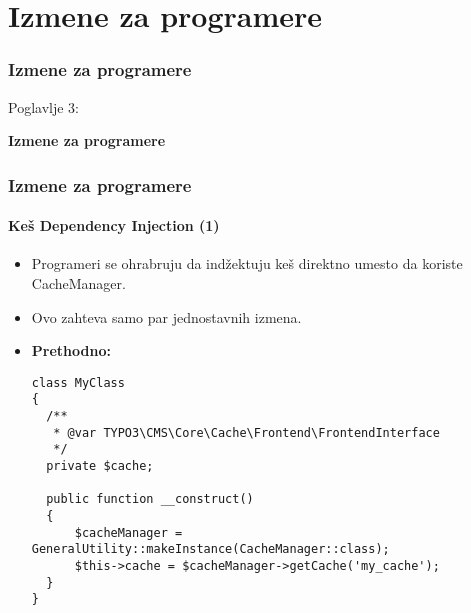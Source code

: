 %

\section{Izmene za programere}
\begin{frame}[fragile]
	\frametitle{Izmene za programere}

	\begin{center}\huge{Poglavlje 3:}\end{center}
	\begin{center}\huge{\color{typo3darkgrey}\textbf{Izmene za programere}}\end{center}

\end{frame}


\begin{frame}[fragile]
	\frametitle{Izmene za programere}
	\framesubtitle{Keš Dependency Injection (1)}

	\lstset{basicstyle=\tiny\ttfamily}

	\begin{itemize}
		\item Programeri se ohrabruju da indžektuju keš direktno umesto da koriste CacheManager.
		\item Ovo zahteva samo par jednostavnih izmena.

		\item \textbf{Prethodno:}

\begin{lstlisting}
class MyClass
{
  /**
   * @var TYPO3\CMS\Core\Cache\Frontend\FrontendInterface
   */
  private $cache;

  public function __construct()
  {
      $cacheManager = GeneralUtility::makeInstance(CacheManager::class);
      $this->cache = $cacheManager->getCache('my_cache');
  }
}
\end{lstlisting}

	\end{itemize}

\end{frame}

